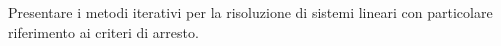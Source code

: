 Presentare i metodi iterativi per la risoluzione di sistemi lineari con particolare riferimento ai criteri di arresto. 